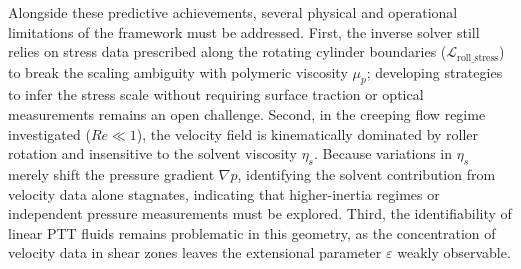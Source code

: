 Alongside these predictive achievements, several physical and operational
limitations of the framework must be addressed. First, the inverse solver still
relies on stress data prescribed along the rotating cylinder boundaries
($\mathcal{L}_{\mathrm{roll\_stress}}$) to break the scaling ambiguity with
polymeric viscosity $\mu_p$; developing strategies to infer the stress scale
without requiring surface traction or optical measurements remains an open
challenge. Second, in the creeping flow regime investigated ($Re \ll 1$), the
velocity field is kinematically dominated by roller rotation and insensitive to
the solvent viscosity $\eta_s$. Because variations in $\eta_s$ merely shift the
pressure gradient $\nabla p$, identifying the solvent contribution from velocity
data alone stagnates, indicating that higher-inertia regimes or independent
pressure measurements must be explored. Third, the identifiability of linear PTT
fluids remains problematic in this geometry, as the concentration of velocity data
in shear zones leaves the extensional parameter $\varepsilon$ weakly observable.

